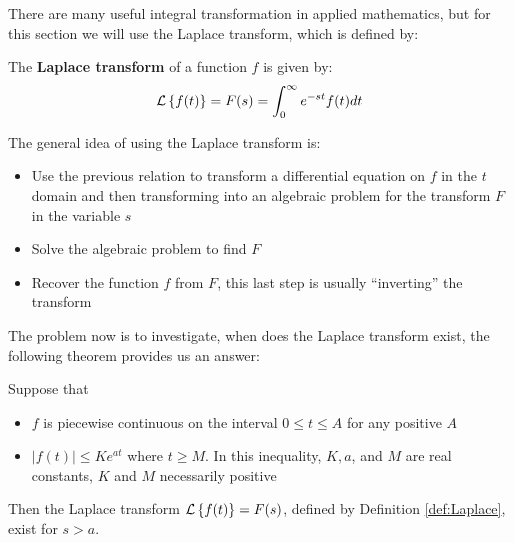 There are many useful integral transformation in applied mathematics, but for this section we will use the Laplace transform, which is defined by:
\begin{define} \label{def:Laplace}
	The \textbf{Laplace transform} of a function $f$ is given by:
	\begin{align*}
	\mathcal{L}\left\lbrace f(t) \right\rbrace = F(s) = \int_0^{\infty} e^{-st}f(t)dt
	\end{align*}
\end{define}
The general idea of using the Laplace transform is:
\begin{itemize}
	\item Use the previous relation to transform a differential equation on $f$ in the $t$ domain and then transforming into an algebraic problem for the transform $F$ in the variable $s$
	\item Solve the algebraic problem to find $F$
	\item Recover the function $f$ from $F$, this last step is usually ``inverting'' the transform
\end{itemize}
The problem now is to investigate, when does the Laplace transform exist, the following theorem provides us an answer:
\begin{thm}
	Suppose that
	\begin{itemize}
		\item $f$ is piecewise continuous on the interval $ 0 \leq t \leq A$ for any positive $A$ 
		\item $ |f(t)| \leq Ke^{at} $ where $ t \geq M$. In this inequality, $K, a$, and $M$ are real constants, $K$ and $M$ necessarily positive
	\end{itemize}
	Then the Laplace transform $ \mathcal{L} \left\lbrace f(t) \right\rbrace = F(s)$, defined by Definition \ref{def:Laplace}, exist for $ s > a$.
\end{thm}

